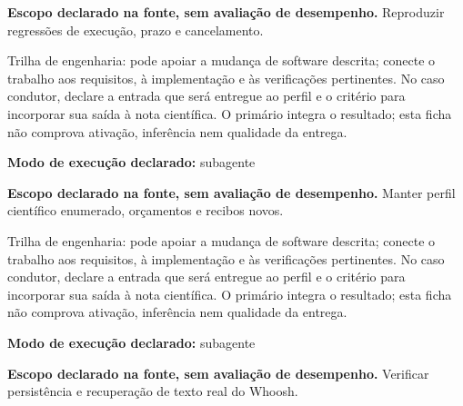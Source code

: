 \begin{descricao}
\textbf{Escopo declarado na fonte, sem avaliação de desempenho.}
Reproduzir regressões de execução, prazo e cancelamento.
\end{descricao}

\begin{funcao}
Trilha de engenharia: pode apoiar a mudança de software descrita; conecte o trabalho aos requisitos, à implementação e às verificações pertinentes. No caso condutor, declare a entrada que será entregue ao perfil e o critério para incorporar sua saída à nota científica. O primário integra o resultado; esta ficha não comprova ativação, inferência nem qualidade da entrega.
\end{funcao}

\begin{arquitetura}
\textbf{Modo de execução declarado:} subagente
\end{arquitetura}


\begin{descricao}
\textbf{Escopo declarado na fonte, sem avaliação de desempenho.}
Manter perfil científico enumerado, orçamentos e recibos novos.
\end{descricao}

\begin{funcao}
Trilha de engenharia: pode apoiar a mudança de software descrita; conecte o trabalho aos requisitos, à implementação e às verificações pertinentes. No caso condutor, declare a entrada que será entregue ao perfil e o critério para incorporar sua saída à nota científica. O primário integra o resultado; esta ficha não comprova ativação, inferência nem qualidade da entrega.
\end{funcao}

\begin{arquitetura}
\textbf{Modo de execução declarado:} subagente
\end{arquitetura}


\begin{descricao}
\textbf{Escopo declarado na fonte, sem avaliação de desempenho.}
Verificar persistência e recuperação de texto real do Whoosh.
\end{descricao}

